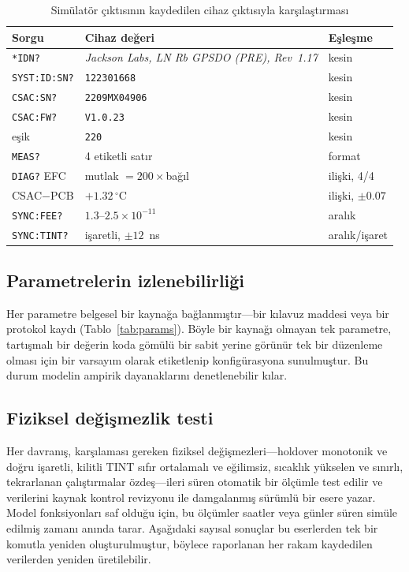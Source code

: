 \documentclass[9pt,twocolumn,a4paper]{extarticle}
\begin{document}
\begin{table}[t]
\caption{Simülatör çıktısının kaydedilen cihaz çıktısıyla karşılaştırması}
\label{tab:fidelity}
\centering
\footnotesize
\renewcommand{\arraystretch}{1.2}
\begin{tabular}{@{}p{}p{}p{}@{}}
\toprule
\textbf{Sorgu} & \textbf{Cihaz değeri} & \textbf{Eşleşme} \\
\midrule
\texttt{*IDN?} & \emph{Jackson Labs, LN Rb GPSDO (PRE), Rev~1.17} & kesin \\
\texttt{SYST:ID:SN?} & \texttt{122301668} & kesin \\
\texttt{CSAC:SN?} & \texttt{2209MX04906} & kesin \\
\texttt{CSAC:FW?} & \texttt{V1.0.23} & kesin \\
eşik & \texttt{220} & kesin \\
\texttt{MEAS?} & 4 etiketli satır & format \\
\texttt{DIAG?} EFC & mutlak $=200\times$bağıl & ilişki, 4/4 \\
CSAC$-$PCB & $+1.32\,^\circ$C & ilişki, $\pm0.07$ \\
\texttt{SYNC:FEE?} & $1.3$--$2.5\times10^{-11}$ & aralık \\
\texttt{SYNC:TINT?} & işaretli, $\pm12$~ns & aralık/işaret \\
\bottomrule
\end{tabular}
\end{table}

\subsection{Parametrelerin izlenebilirliği}
Her parametre belgesel bir kaynağa bağlanmıştır---bir kılavuz maddesi veya bir protokol kaydı (Tablo~\ref{tab:params}). Böyle bir kaynağı olmayan tek parametre, tartışmalı bir değerin koda gömülü bir sabit yerine görünür tek bir düzenleme olması için bir varsayım olarak etiketlenip konfigürasyona sunulmuştur. Bu durum modelin ampirik dayanaklarını denetlenebilir kılar.

\subsection{Fiziksel değişmezlik testi}
Her davranış, karşılaması gereken fiziksel değişmezleri---holdover monotonik ve doğru işaretli, kilitli TINT sıfır ortalamalı ve eğilimsiz, sıcaklık yükselen ve sınırlı, tekrarlanan çalıştırmalar özdeş---ileri süren otomatik bir ölçümle test edilir ve verilerini kaynak kontrol revizyonu ile damgalanmış sürümlü bir esere yazar. Model fonksiyonları saf olduğu için, bu ölçümler saatler veya günler süren simüle edilmiş zamanı anında tarar. Aşağıdaki sayısal sonuçlar bu eserlerden tek bir komutla yeniden oluşturulmuştur, böylece raporlanan her rakam kaydedilen verilerden yeniden üretilebilir.
\end{document}
